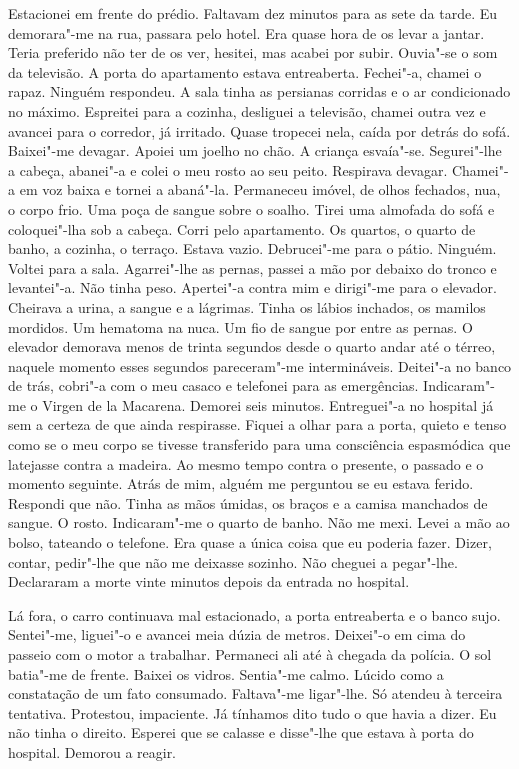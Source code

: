 Estacionei em frente do prédio. Faltavam dez minutos para as sete da
tarde. Eu demorara"-me na rua, passara pelo hotel. Era quase hora de os
levar a jantar. Teria preferido não ter de os ver, hesitei, mas acabei
por subir. Ouvia"-se o som da televisão. A porta do apartamento estava
entreaberta. Fechei"-a, chamei o rapaz. Ninguém respondeu. A sala tinha
as persianas corridas e o ar condicionado no máximo. Espreitei para a
cozinha, desliguei a televisão, chamei outra vez e avancei para o
corredor, já irritado. Quase tropecei nela, caída por detrás do sofá.
Baixei"-me devagar. Apoiei um joelho no chão. A criança esvaía"-se.
Segurei"-lhe a cabeça, abanei"-a e colei o meu rosto ao seu peito.
Respirava devagar. Chamei"-a em voz baixa e tornei a abaná"-la.
Permaneceu imóvel, de olhos fechados, nua, o corpo frio. Uma poça de
sangue sobre o soalho. Tirei uma almofada do sofá e coloquei"-lha sob a
cabeça. Corri pelo apartamento. Os quartos, o quarto de banho, a
cozinha, o terraço. Estava vazio. Debrucei"-me para o pátio. Ninguém.
Voltei para a sala. Agarrei"-lhe as pernas, passei a mão por debaixo do
tronco e levantei"-a. Não tinha peso. Apertei"-a contra mim e dirigi"-me
para o elevador. Cheirava a urina, a sangue e a lágrimas. Tinha os
lábios inchados, os mamilos mordidos. Um hematoma na nuca. Um fio de
sangue por entre as pernas. O elevador demorava menos de trinta segundos
desde o quarto andar até o térreo, naquele momento esses
segundos pareceram"-me intermináveis. Deitei"-a no banco de trás,
cobri"-a com o meu casaco e telefonei para as emergências. Indicaram"-me
o Virgen de la Macarena. Demorei seis minutos. Entreguei"-a no hospital
já sem a certeza de que ainda respirasse. Fiquei a olhar para a porta,
quieto e tenso como se o meu corpo se tivesse transferido para uma
consciência espasmódica que latejasse contra a madeira. Ao mesmo tempo
contra o presente, o passado e o momento seguinte. Atrás de mim, alguém
me perguntou se eu estava ferido. Respondi que não. Tinha as mãos
úmidas, os braços e a camisa manchados de sangue. O rosto.
Indicaram"-me o quarto de banho. Não me mexi. Levei a mão ao bolso,
tateando o telefone. Era quase a única coisa que eu poderia fazer.
Dizer, contar, pedir"-lhe que não me deixasse sozinho. Não cheguei a
pegar"-lhe. Declararam a morte vinte minutos depois da entrada no
hospital.

Lá fora, o carro continuava mal estacionado, a porta entreaberta e o
banco sujo. Sentei"-me, liguei"-o e avancei meia dúzia de metros.
Deixei"-o em cima do passeio com o motor a trabalhar. Permaneci ali até
à chegada da polícia. O sol batia"-me de frente. Baixei os vidros.
Sentia"-me calmo. Lúcido como a constatação de um fato consumado.
Faltava"-me ligar"-lhe. Só atendeu à terceira tentativa. Protestou,
impaciente. Já tínhamos dito tudo o que havia a dizer. Eu não tinha o
direito. Esperei que se calasse e disse"-lhe que estava à porta do
hospital. Demorou a reagir.

